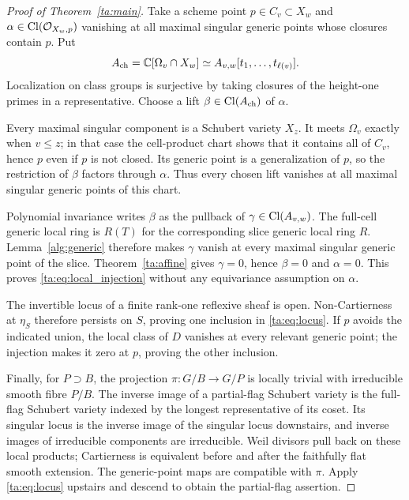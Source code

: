 \begin{proof}[Proof of Theorem~\ref{ta:main}]
Take a scheme point $p\in C_v\subset X_w$ and
$\alpha\in\operatorname{Cl}(\mathcal O_{X_w,p})$ vanishing at all maximal singular
generic points whose closures contain $p$. Put
\[
 A_{\mathrm{ch}}=\mathbb C[\Omega_v\cap X_w]
 \simeq A_{v,w}[t_1,\ldots,t_{\ell(v)}].
\]
Localization on class groups is surjective by taking closures of the
height-one primes in a representative. Choose a lift
$\beta\in\operatorname{Cl}(A_{\mathrm{ch}})$ of $\alpha$.

Every maximal singular component is a Schubert variety $X_z$.
It meets $\Omega_v$ exactly when $v\leq z$; in that case
the cell-product chart shows that it contains all of $C_v$, hence $p$
even if $p$ is not closed. Its generic point is a generalization
of $p$, so the restriction of $\beta$ factors through $\alpha$.
Thus every chosen lift vanishes at all maximal singular generic points
of this chart.

Polynomial invariance writes $\beta$ as the pullback of
$\gamma\in\operatorname{Cl}(A_{v,w})$. The full-cell generic local ring is
$R(T)$ for the corresponding slice generic local ring $R$.
Lemma~\ref{alg:generic} therefore makes $\gamma$ vanish at every
maximal singular generic point of the slice.
Theorem~\ref{ta:affine} gives $\gamma=0$, hence $\beta=0$ and
$\alpha=0$. This proves \eqref{ta:eq:local_injection} without any
equivariance assumption on $\alpha$.

The invertible locus of a finite rank-one reflexive sheaf is open.
Non-Cartierness at $\eta_S$ therefore persists on $S$, proving one
inclusion in \eqref{ta:eq:locus}. If $p$ avoids the indicated union,
the local class of $D$ vanishes at every relevant generic point;
the injection makes it zero at $p$, proving the other inclusion.

Finally, for $P\supset B$, the projection $\pi:G/B\to G/P$ is
locally trivial with irreducible smooth fibre $P/B$.
The inverse image of a partial-flag Schubert variety is the full-flag
Schubert variety indexed by the longest representative of its coset.
Its singular locus is the inverse image of the singular locus
downstairs, and inverse images of irreducible components are
irreducible. Weil divisors pull back on these local products;
Cartierness is equivalent before and after the faithfully flat smooth
extension. The generic-point maps are compatible with $\pi$.
Apply \eqref{ta:eq:locus} upstairs and descend to obtain the
partial-flag assertion.
\end{proof}
